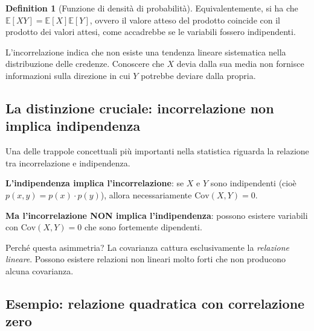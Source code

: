 \documentclass[
  letterpaper,
  DIV=11,
  numbers=noendperiod,
  oneside]{scrreprt}
\theoremstyle{definition}
\theoremstyle{plain}
\theoremstyle{definition}
\newtheorem{definition}{Definition}[chapter]
\theoremstyle{remark}
\begin{document}
\begin{definition}[Funzione di densità di
probabilità]
Equivalentemente, si ha che
\(\mathbb{E}[XY] = \mathbb{E}[X]\mathbb{E}[Y]\), ovvero il valore atteso
del prodotto coincide con il prodotto dei valori attesi, come accadrebbe
se le variabili fossero indipendenti.

L'incorrelazione indica che non esiste una tendenza lineare sistematica
nella distribuzione delle credenze. Conoscere che \(X\) devia dalla sua
media non fornisce informazioni sulla direzione in cui \(Y\) potrebbe
deviare dalla propria.

\subsection{La distinzione cruciale: incorrelazione non implica
indipendenza}\label{la-distinzione-cruciale-incorrelazione-non-implica-indipendenza}

Una delle trappole concettuali più importanti nella statistica riguarda
la relazione tra incorrelazione e indipendenza.

\begin{tcolorbox}[enhanced jigsaw, arc=.35mm, breakable, colbacktitle=quarto-callout-important-color!10!white, opacityback=0, toprule=.15mm, rightrule=.15mm, colback=white, opacitybacktitle=0.6, leftrule=.75mm, coltitle=black, bottomtitle=1mm, left=2mm, toptitle=1mm, title=\textcolor{quarto-callout-important-color}{\faExclamation}\hspace{0.5em}{Relazione asimmetrica}, titlerule=0mm, bottomrule=.15mm, colframe=quarto-callout-important-color-frame]

\textbf{L'indipendenza implica l'incorrelazione}: se \(X\) e \(Y\) sono
indipendenti (cioè \(p(x,y) = p(x) \cdot p(y)\)), allora necessariamente
\(\text{Cov}(X,Y) = 0\).

\textbf{Ma l'incorrelazione NON implica l'indipendenza}: possono
esistere variabili con \(\text{Cov}(X,Y) = 0\) che sono fortemente
dipendenti.

\end{tcolorbox}

Perché questa asimmetria? La covarianza cattura esclusivamente la
\emph{relazione lineare}. Possono esistere relazioni non lineari molto
forti che non producono alcuna covarianza.

\subsection{Esempio: relazione quadratica con correlazione
zero}\label{esempio-relazione-quadratica-con-correlazione-zero}


\end{definition}
\end{document}
